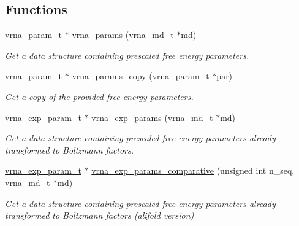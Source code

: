 \subsection*{Functions}
\begin{DoxyCompactItemize}
\item 
\mbox{\hyperlink{group__energy__parameters_ga8a69ca7d787e4fd6079914f5343a1f35}{vrna\+\_\+param\+\_\+t}} $\ast$ \mbox{\hyperlink{group__energy__parameters_gad0e3e7e74bdc50d1709d40c92993185e}{vrna\+\_\+params}} (\mbox{\hyperlink{group__model__details_ga1f8a10e12a0a1915f2a4eff0b28ea17c}{vrna\+\_\+md\+\_\+t}} $\ast$md)
\begin{DoxyCompactList}\small\item\em Get a data structure containing prescaled free energy parameters. \end{DoxyCompactList}\item 
\mbox{\hyperlink{group__energy__parameters_ga8a69ca7d787e4fd6079914f5343a1f35}{vrna\+\_\+param\+\_\+t}} $\ast$ \mbox{\hyperlink{group__energy__parameters_ga4bffa39f26e7746148444dd8a8426eca}{vrna\+\_\+params\+\_\+copy}} (\mbox{\hyperlink{group__energy__parameters_ga8a69ca7d787e4fd6079914f5343a1f35}{vrna\+\_\+param\+\_\+t}} $\ast$par)
\begin{DoxyCompactList}\small\item\em Get a copy of the provided free energy parameters. \end{DoxyCompactList}\item 
\mbox{\hyperlink{group__energy__parameters_ga01d8b92fe734df8d79a6169482c7d8d8}{vrna\+\_\+exp\+\_\+param\+\_\+t}} $\ast$ \mbox{\hyperlink{group__energy__parameters_gab1f3016f96aa96bff020cdd904605afa}{vrna\+\_\+exp\+\_\+params}} (\mbox{\hyperlink{group__model__details_ga1f8a10e12a0a1915f2a4eff0b28ea17c}{vrna\+\_\+md\+\_\+t}} $\ast$md)
\begin{DoxyCompactList}\small\item\em Get a data structure containing prescaled free energy parameters already transformed to Boltzmann factors. \end{DoxyCompactList}\item 
\mbox{\hyperlink{group__energy__parameters_ga01d8b92fe734df8d79a6169482c7d8d8}{vrna\+\_\+exp\+\_\+param\+\_\+t}} $\ast$ \mbox{\hyperlink{group__energy__parameters_gaf78c09e685e6eef4100b1a41d4042550}{vrna\+\_\+exp\+\_\+params\+\_\+comparative}} (unsigned int n\+\_\+seq, \mbox{\hyperlink{group__model__details_ga1f8a10e12a0a1915f2a4eff0b28ea17c}{vrna\+\_\+md\+\_\+t}} $\ast$md)
\begin{DoxyCompactList}\small\item\em Get a data structure containing prescaled free energy parameters already transformed to Boltzmann factors (alifold version) \end{DoxyCompactList}\item 

\end{DoxyCompactItemize}
